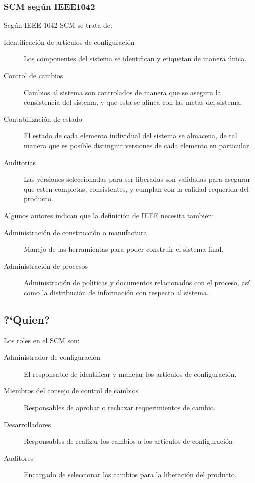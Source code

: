 \begin{frame}
\frametitle{SCM seg\'un IEEE1042}
Seg\'un IEEE 1042 SCM se trata de: 
\begin{description}
\item[Identificaci\'on de art\'iculos de configuraci\'on] Los componentes del
sistema se identifican y etiquetan de manera \'unica. 
\item[Control de cambios] Cambios al sistema son controlados de manera que se
asegura la consistencia del sistema, y que esta se alinea con las metas del
sistema. 
\item[Contabilizaci\'on de estado] El estado de cada elemento individual del
sistema se almacena, de tal manera que es posible distinguir versiones de cada
elemento en particular. 
\item[Auditorias] Las versiones seleccionadas para ser liberadas son validadas
para asegurar que esten completas, consistentes, y cumplan con la calidad
requerida del producto.
\end{description}
\end{frame}
\begin{frame}
Algunos autores indican que la definici\'on de IEEE necesita tambi\'en:
\begin{description}
\item[Administraci\'on de construcci\'on o manufactura] Manejo de las
herramientas para poder construir el sistema final. 
\item[Administraci\'on de procesos] Administraci\'on de politicas y documentos
relacionados con el proceso, as\'i como la distribuci\'on de informaci\'on con
respecto al sistema. 
\end{description}
\end{frame}
\subsection{?`Quien?}
\begin{frame}
Los roles en el SCM son: 
\begin{description}
\item[Administrador de configuraci\'on] El responsable de identificar y manejar
los art\'iculos de configuraci\'on.
\item[Miembros del consejo de control de cambios] Responsables de aprobar o
rechazar requerimientos de cambio. 
\item[Desarrolladores] Responsables de realizar los cambios a los art\'iculos de
configuraci\'on
\item[Auditores] Encargado de seleccionar los cambios para la liberaci\'on del
producto. 
\end{description}
\end{frame}
